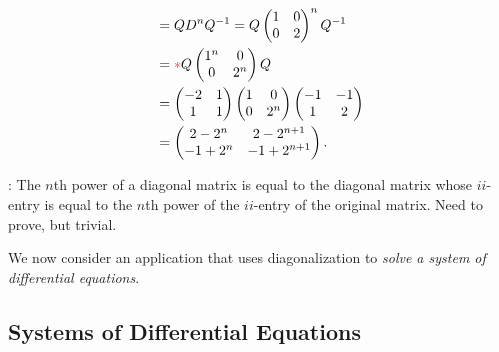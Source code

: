 \begin{example}
\begin{align*}
        & = QD^nQ^{-1} = Q \begin{pmatrix} 1 & 0 \\ 0 & 2 \end{pmatrix}^n Q^{-1} \\
        & =\RED{*} Q \begin{pmatrix} 1^n & 0 \\ 0 & 2^n \end{pmatrix} Q \\
        & = \begin{pmatrix} -2 & 1 \\ 1 & 1 \end{pmatrix}\begin{pmatrix} 1 & 0 \\ 0 & 2^n \end{pmatrix}\begin{pmatrix} -1 & -1 \\ 1 & 2 \end{pmatrix} \\
        & = \begin{pmatrix} 2 - 2^n & 2 - 2^{n + 1} \\ -1 + 2^n & -1 + 2^{n + 1} \end{pmatrix}.
\end{align*}
\end{example}

\begin{note}
\RED{*}: The \(n\)th power of a diagonal matrix is equal to the diagonal matrix whose \(ii\)-entry is equal to the \(n\)th power of the \(ii\)-entry of the original matrix.
Need to prove, but trivial.
\end{note}

We now consider an application that uses diagonalization to \emph{solve a system of differential equations}.

\subsection{Systems of Differential Equations} \label{sec 5.2.2}

